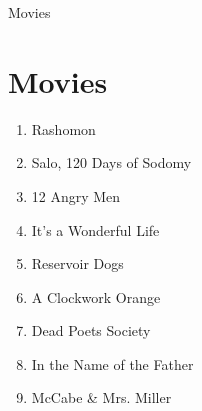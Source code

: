 \documentclass{article}
\begin{document}
Movies 

\section*{Movies}
\begin{enumerate}
\item Rashomon
\item Salo, 120 Days of Sodomy
\item 12 Angry Men
\item It's a Wonderful Life
\item Reservoir Dogs
\item A Clockwork Orange
\item Dead Poets Society
\item In the Name of the Father
\item McCabe \& Mrs. Miller

\end{enumerate}
\end{document}
